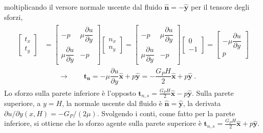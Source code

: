 \documentclass[letterpaper,10pt,italian]{jupyterBook}
\begin{document}
moltiplicando il versore normale uscente dal fluido
\(\mathbf{\hat{n}} = - \mathbf{\hat{y}}\) per il tensore degli sforzi,
\begin{equation*}
\begin{split}\begin{aligned}
 \begin{bmatrix} t_x \\ t_y \end{bmatrix} & = 
 \begin{bmatrix}
   -p & \mu \dfrac{\partial u}{\partial y} \\ \mu \dfrac{\partial u}{\partial y} & -p
 \end{bmatrix} 
 \begin{bmatrix} n_x \\ n_y \end{bmatrix} = 
 \begin{bmatrix}
   -p & \mu \dfrac{\partial u}{\partial y} \\ \mu \dfrac{\partial u}{\partial y} & -p
 \end{bmatrix} 
 \begin{bmatrix} 0 \\ -1 \end{bmatrix} = 
 \begin{bmatrix} - \mu \dfrac{\partial u}{\partial y} \\ p \end{bmatrix} \\
 & \qquad \rightarrow \qquad \mathbf{t_n} =  - \mu \dfrac{\partial u}{\partial y} \mathbf{\hat{x}} + p \mathbf{\hat{y}} = - \dfrac{G_P H}{2} \mathbf{\hat{x}} + p \mathbf{\hat{y}} \ .
\end{aligned}\end{split}
\end{equation*}
\sphinxAtStartPar
Lo sforzo sulla parete inferiore è l’opposto
\(\mathbf{t}_{n,s} = \frac{G_P H}{2} \mathbf{\hat{x}} - p \mathbf{\hat{y}}\). Sulla
parete superiore, a \(y=H\), la normale uscente dal fluido è
\(\mathbf{\hat{n}} = \mathbf{\hat{y}}\), la derivata
\(\partial u/\partial y (x,H) = -G_P/(2\mu)\). Svolgendo i conti, come
fatto per la parete inferiore, si ottiene che lo sforzo agente sulla
parete superiore è
\(\mathbf{t}_{n,s} = \frac{G_P H}{2} \mathbf{\hat{x}} + p \mathbf{\hat{y}}\).
\end{document}
